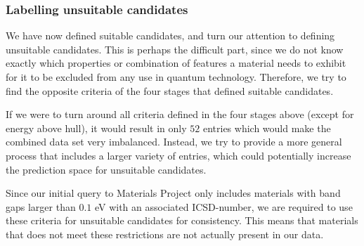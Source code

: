 \begin{table}[!ht]
\centering
\caption{A table that compares two different implementations of the same screen procedure. \citeauthor{Ferrenti2020} extracted information March of $2020$, while we did the extraction during April of $2021$. The adjusted difference is given as our reported entries divided on their reported entries.}
\label{tab:approach-1-suitable-candidates}
\noindent{}
\end{table}

\subsubsection{Labelling unsuitable candidates}

We have now defined suitable candidates, and turn our attention to defining unsuitable candidates. This is perhaps the difficult part, since we do not know exactly which properties or combination of features a material needs to exhibit for it to be excluded from any use in quantum technology. Therefore, we try to find the opposite criteria of the four stages that defined suitable candidates.

If we were to turn around all criteria defined in the four stages above (except for energy above hull), it would result in only $52$ entries which would make the combined data set very imbalanced. Instead, we try to provide a more general process that includes a larger variety of entries, which could potentially increase the prediction space for unsuitable candidates.

Since our initial query to Materials Project only includes materials with band gaps larger than $0.1$ eV with an associated ICSD-number, we are required to use these criteria for unsuitable candidates for consistency. This means that materials that does not meet these restrictions are not actually present in our data.

